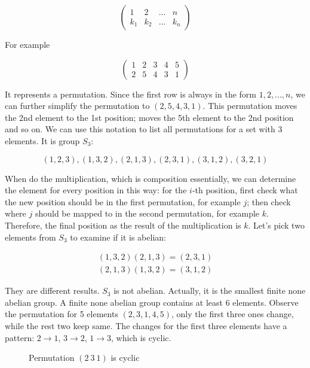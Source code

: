 \documentclass[b5paper]{article}
\begin{document}
\[
\begin{pmatrix}
1 & 2 & ... & n \\
k_1 & k_2 & ... & k_n
\end{pmatrix}
\]

For example

\[
\begin{pmatrix}
1 & 2 & 3 & 4 & 5 \\
2 & 5 & 4 & 3 & 1
\end{pmatrix}
\]

It represents a permutation. Since the first row is always in the form $1, 2, ..., n$, we can further simplify the permutation to $(2, 5, 4, 3, 1)$. This permutation moves the 2nd element to the 1st position; moves the 5th element to the 2nd position and so on. We can use this notation to list all permutations for a set with 3 elements. It is group $S_3$:

\[
(1, 2, 3), (1, 3, 2), (2, 1, 3), (2, 3, 1), (3, 1, 2), (3, 2, 1)
\]

When do the multiplication, which is composition essentially, we can determine the element for every position in this way: for the $i$-th position, first check what the new position should be in the first permutation, for example $j$; then check where $j$ should be mapped to in the second permutation, for example $k$. Therefore, the final position as the result of the multiplication is $k$. Let's pick two elements from $S_3$ to examine if it is abelian:

\[
\begin{array}{l}
(1, 3, 2) (2, 1, 3) = (2, 3, 1) \\
(2, 1, 3) (1, 3, 2) = (3, 1, 2)
\end{array}
\]

They are different results. $S_3$ is not abelian. Actually, it is the smallest finite none abelian group. A finite none abelian group contains at least 6 elements. Observe the permutation for 5 elements $(2, 3, 1, 4, 5)$, only the first three ones change, while the rest two keep same. The changes for the first three elements have a pattern: $2 \to 1$, $3 \to 2$, $1 \to 3$, which is cyclic.

\begin{figure}[htbp]
\centering
{}
\caption{Permutation $(2\ 3\ 1)$ is cyclic}
\label{fig:cycle-permutation}
\end{figure}
\end{document}

